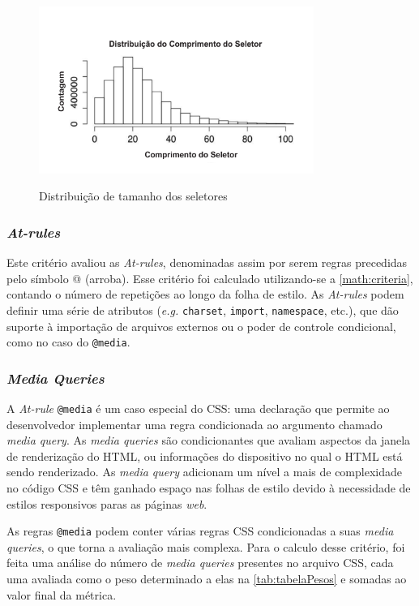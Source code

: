 \begin{figure}[!htb]
	\centering
	\caption{Distribuição de tamanho dos seletores}
	\includegraphics[width=0.8\textwidth]{./04-figuras/dist_selectorL}
	\label{fig:distributionLength}
\end{figure}

\subsubsection{\textit{At-rules}}
Este critério avaliou as \textit{At-rules}, denominadas assim por serem regras precedidas pelo símbolo @ (arroba). Esse critério foi calculado utilizando-se a \autoref{math:criteria}, contando o número de repetições ao longo da folha de estilo. As \textit{At-rules} podem definir uma série de atributos (\textit{e.g.} \texttt{charset}, \texttt{import}, \texttt{namespace}, etc.), que dão suporte à importação de arquivos externos ou o poder de controle condicional, como no caso do \texttt{@media}.

\subsubsection{\textit{Media Queries}}
A \textit{At-rule} \texttt{@media} é um caso especial do CSS: uma declaração que permite ao desenvolvedor implementar uma regra condicionada ao argumento chamado \textit{media query}. As \textit{media queries} são condicionantes que avaliam aspectos da janela de renderização do HTML, ou informações do dispositivo no qual o HTML está sendo renderizado. As \textit{media query} adicionam um nível a mais de complexidade no código CSS e têm ganhado espaço nas folhas de estilo devido à necessidade de estilos responsivos paras as páginas \textit{web}. 

As regras \texttt{@media} podem conter várias regras CSS condicionadas a suas \textit{media queries}, o que torna a avaliação mais complexa. Para o calculo desse critério, foi feita uma análise do número de \textit{media queries} presentes no arquivo CSS, cada uma avaliada como o peso determinado a elas na \autoref{tab:tabelaPesos} e somadas ao valor final da métrica.

